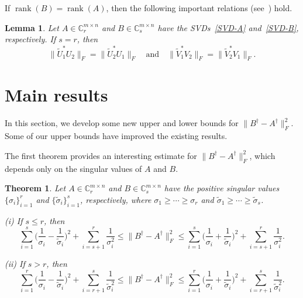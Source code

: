 \documentclass[11pt]{article}
\newtheorem{theorem}{Theorem}[section]
\newtheorem{lemma}{Lemma}[section]
\DeclareMathOperator*{\rank}{rank}
\begin{document}
If $\rank(B)=\rank(A)$, then the following important relations (see~\cite[Lemma~2.2]{Chen2016}) hold.

\begin{lemma}\label{s=r}
Let $A\in\mathbb{C}^{m\times n}_{r}$ and $B\in\mathbb{C}^{m\times n}_{s}$ have the SVDs~\eqref{SVD-A} and~\eqref{SVD-B}, respectively. If $s=r$, then
\begin{displaymath}
\|\widetilde{U}_{1}^{\ast}U_{2}\|_{F}=\|\widetilde{U}_{2}^{\ast}U_{1}\|_{F} \quad \text{and} \quad \|\widetilde{V}_{1}^{\ast}V_{2}\|_{F}=\|\widetilde{V}_{2}^{\ast}V_{1}\|_{F}.
\end{displaymath}
\end{lemma}

\section{Main results}

\label{sec:main}

\setcounter{equation}{0}

In this section, we develop some new upper and lower bounds for $\|B^{\dagger}-A^{\dagger}\|_{F}^{2}$. Some of our upper bounds have improved the existing results.

The first theorem provides an interesting estimate for $\|B^{\dagger}-A^{\dagger}\|_{F}^{2}$, which depends only on the singular values of $A$ and $B$.

\begin{theorem}
Let $A\in\mathbb{C}^{m\times n}_{r}$ and $B\in\mathbb{C}^{m\times n}_{s}$ have the positive singular values $\{\sigma_{i}\}_{i=1}^{r}$ and $\{\widetilde{\sigma}_{i}\}_{i=1}^{s}$, respectively, where $\sigma_{1}\geq\cdots\geq\sigma_{r}$ and $\widetilde{\sigma}_{1}\geq\cdots\geq\widetilde{\sigma}_{s}$.

{\rm (i)} If $s\leq r$, then
\begin{equation}\label{up+low1}
\sum_{i=1}^{s}\bigg(\frac{1}{\sigma_{i}}-\frac{1}{\widetilde{\sigma}_{i}}\bigg)^{2}+\sum_{i=s+1}^{r}\frac{1}{\sigma_{i}^{2}}\leq\|B^{\dagger}-A^{\dagger}\|_{F}^{2}\leq\sum_{i=1}^{s}\bigg(\frac{1}{\sigma_{i}}+\frac{1}{\widetilde{\sigma}_{i}}\bigg)^{2}+\sum_{i=s+1}^{r}\frac{1}{\sigma_{i}^{2}}.
\end{equation}

{\rm (ii)} If $s>r$, then
\begin{equation}\label{up+low2}
\sum_{i=1}^{r}\bigg(\frac{1}{\sigma_{i}}-\frac{1}{\widetilde{\sigma}_{i}}\bigg)^{2}+\sum_{i=r+1}^{s}\frac{1}{\widetilde{\sigma}_{i}^{2}}\leq\|B^{\dagger}-A^{\dagger}\|_{F}^{2}\leq\sum_{i=1}^{r}\bigg(\frac{1}{\sigma_{i}}+\frac{1}{\widetilde{\sigma}_{i}}\bigg)^{2}+\sum_{i=r+1}^{s}\frac{1}{\widetilde{\sigma}_{i}^{2}}.
\end{equation}
\end{theorem}
\end{document}
